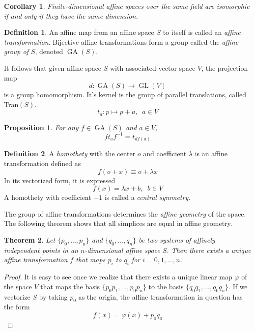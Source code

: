 \documentclass{article}
\DeclareMathOperator{\GL}{GL}
\DeclareMathOperator{\GA}{GA}
\newtheorem{theorem}{Theorem}[section]
\newtheorem{proposition}[theorem]{Proposition}
\newtheorem{corollary}{Corollary}[theorem]
\theoremstyle{remark}
\theoremstyle{definition}
\newtheorem{definition}{Definition}[section]
\begin{document}
\begin{corollary}
Finite-dimensional affine spaces over the same field are isomorphic if and only if they have the same dimension. 
\end{corollary}

\begin{definition}
An affine map from an affine space $S$ to itself is called an \textit{affine transformation}. Bijective affine transformations form a group called the \textit{affine group of $S$}, denoted $\GA(S)$. 
\end{definition}

It follows that given affine space $S$ with associated vector space $V$, the projection map
\[d: \GA(S) \longrightarrow \GL(V)\]
is a group homomorphism. It's kernel is the group of parallel translations, called Tran$(S)$. 
\[t_a : p \mapsto p + a, \;\; a \in V\]

\begin{proposition}
For any $f \in \GA(S)$ and $a \in V$, 
\[f t_a f^{-1} = t_{df(a)}\]
\end{proposition}

\begin{definition}
A \textit{homothety} with the center $o$ and coefficient $\lambda$ is an affine transformation defined as
\[f( o + x ) \equiv o + \lambda x\]
In its vectorized form, it is expressed
\[f(x) = \lambda x + b, \;\; b \in V\]
A homothety with coefficient $-1$ is called a \textit{central symmetry}. 
\end{definition}

The group of affine transformations determines the \textit{affine geometry} of the space. The following theorem shows that all simplices are equal in affine geometry. 

\begin{theorem}
Let $\{p_0, ..., p_n\}$ and $\{q_0, ..., q_n\}$ be two systems of affinely independent points in an $n$-dimensional affine space $S$. Then there exists a unique affine transformation $f$ that maps $p_i$ to $q_i$ for $i = 0, 1, ..., n$. 
\end{theorem}
\begin{proof}
It is easy to see once we realize that there exists a unique linear map $\varphi$ of the space $V$ that maps the basis $\{\overline{p_0 p_1}, ..., \overline{p_0 p_n}\}$ to the basis $\{\overline{q_0 q_1}, ..., \overline{q_0 q_n}\}$. If we vectorize $S$ by taking $p_0$ as the origin, the affine transformation in question has the form 
\[f(x) = \varphi(x) + \overline{p_0 q_0}\]
\end{proof}
\end{document}
